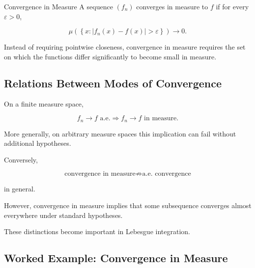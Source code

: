 \begin{definitionbox}{Convergence in Measure}
A sequence \((f_n)\) converges in measure to \(f\) if for every
\(\varepsilon>0\),

\[
\boxed{
\mu\left(
\left\{
x:
|f_n(x)-f(x)|>\varepsilon
\right\}
\right)
\to0.
}
\]
\end{definitionbox}

Instead of requiring pointwise closeness, convergence in measure requires
the set on which the functions differ significantly to become small in
measure.

\subsection{Relations Between Modes of Convergence}
\label{subsec:relations-measure-convergence}

On a finite measure space,

\[
\boxed{
f_n\to f
\text{ a.e.}
\Longrightarrow
f_n\to f
\text{ in measure}.
}
\]

More generally, on arbitrary measure spaces this implication can fail
without additional hypotheses.

Conversely,

\[
\boxed{
\text{convergence in measure}
\not\Longrightarrow
\text{a.e. convergence}
}
\]

in general.

However, convergence in measure implies that some subsequence converges
almost everywhere under standard hypotheses.

These distinctions become important in Lebesgue integration.

\subsection{Worked Example: Convergence in Measure}
\label{subsec:worked-convergence-measure}

